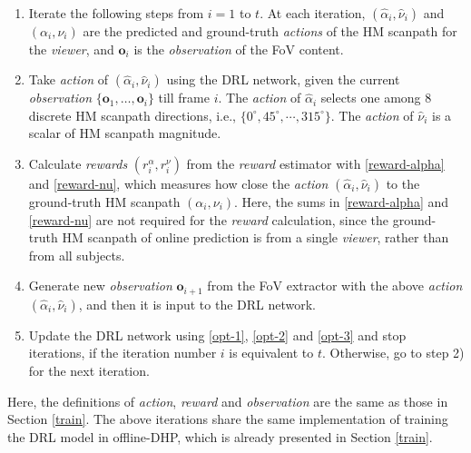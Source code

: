 \documentclass[10pt,journal,compsoc]{IEEEtran}
\begin{document}
%
\begin{enumerate}
  \item Iterate the following steps from $i=1$ to $t$. At each iteration, $(\hat{\alpha}_i,\hat{\nu}_i)$ and $(\alpha_i,\nu_i)$ are the predicted and ground-truth \textit{actions} of the HM scanpath for the \textit{viewer}, and $\mathbf{o}_i$ is the \textit{observation} of the FoV content.
  \item Take \textit{action} of $(\hat{\alpha}_i,\hat{\nu}_i)$ using the DRL network, given the current \textit{observation} $\{\mathbf{o}_1, \ldots, \mathbf{o}_i\}$ till frame $i$. The \textit{action} of $\hat{\alpha}_i$ selects one among 8 discrete HM scanpath directions, i.e., $\{ 0^{\circ}, 45^{\circ}, \cdots, 315^{\circ} \}$. The \textit{action} of $\hat{\nu}_i$ is a scalar of HM scanpath magnitude.
  \item Calculate \textit{rewards} $(r^{\alpha}_{i}, r^{\nu}_{i})$ from the \textit{reward} estimator with \eqref{reward-alpha} and \eqref{reward-nu}, which measures how close the \textit{action} $(\hat{\alpha}_i,\hat{\nu}_i)$ to the ground-truth HM scanpath $(\alpha_i,\nu_i)$. Here, the sums in \eqref{reward-alpha} and \eqref{reward-nu}  are not required for the \textit{reward} calculation, since the ground-truth HM scanpath of online prediction is from a single \textit{viewer}, rather than from all subjects.
  \item Generate new \textit{observation} ${\mathbf{o}_{i+1}}$ from the FoV extractor with the above \textit{action} $(\hat{\alpha}_i,\hat{\nu}_i)$, and then it is input to the DRL network.
  \item Update the DRL network using \eqref{opt-1}, \eqref{opt-2} and \eqref{opt-3} and stop iterations, if the iteration number $i$ is equivalent to $t$. Otherwise, go to step 2) for the next iteration.
\end{enumerate}
Here,  the definitions of \textit{action}, \textit{reward} and \textit{observation} are the same as those in Section \ref{train}.
The above iterations share the same implementation of training the DRL model in offline-DHP, which is already presented in Section \ref{train}.
\end{document}
